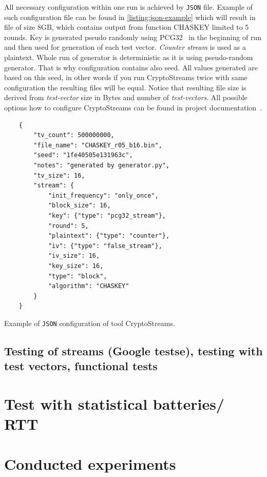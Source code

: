 \documentclass[
    digital,    %
    oneside,    %
    color,
    11pt,
    nocover,
    notable,
    nolof,
    nolot,
    final
]{fithesis3}
\begin{document}
All necessary configuration within one run is achieved by \texttt{JSON} file. Example of such configuration file can be found in \cref{listing:json-example} which will result in file of size 8GB, which contains output from function CHASKEY limited to 5 rounds. Key is generated pseudo randomly using PCG32~\cite{pcgGen} in the beginning of run and then used for generation of each test vector. \textit{Counter stream} is used as a plaintext. Whole run of generator is deterministic as it is using pseudo-random generator. That is why configuration contains also seed. All values generated are based on this seed, in other words if you run CryptoStreams twice with same configuration the resulting files will be equal. Notice that resulting file size is derived from \textit{test-vector} size in Bytes and number of \textit{test-vectors}. All possible options how to configure CryptoStreams can be found in project documentation~\cite{CryptoStreams-wiki}.

\begin{listing}
	\begin{verbatim}
	{
		"tv_count": 500000000,
		"file_name": "CHASKEY_r05_b16.bin",
		"seed": "1fe40505e131963c",
		"notes": "generated by generator.py",
		"tv_size": 16,
		"stream": {
			"init_frequency": "only_once",
			"block_size": 16,
			"key": {"type": "pcg32_stream"},
			"round": 5,
			"plaintext": {"type": "counter"},
			"iv": {"type": "false_stream"},
			"iv_size": 16,
			"key_size": 16,
			"type": "block",
			"algorithm": "CHASKEY"
		}
	}
	\end{verbatim}
	\caption{Example of \texttt{JSON} configuration of tool CryptoStreams.}
	\label{listing:json-example}
\end{listing}


\subsection{Testing of streams (Google testse), testing with test vectors, functional tests}

\section{Test with statistical batteries/ RTT}

\section{Conducted experiments}
\end{document}
